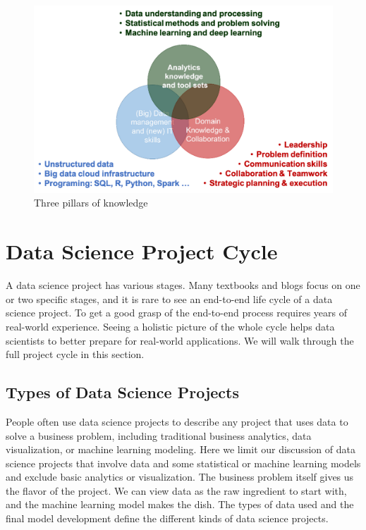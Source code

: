 \documentclass[
  12pt,
]{krantz}
\begin{document}
\begin{figure}

{\centering \includegraphics[width=0.8\linewidth]{images/softskill2} 

}

\caption{Three pillars of knowledge}\label{fig:threepillars}
\end{figure}

\hypertarget{data-science-project-cycle}{%
\section{Data Science Project Cycle}\label{data-science-project-cycle}}

A data science project has various stages. Many textbooks and blogs focus on one or two specific stages, and it is rare to see an end-to-end life cycle of a data science project. To get a good grasp of the end-to-end process requires years of real-world experience. Seeing a holistic picture of the whole cycle helps data scientists to better prepare for real-world applications. We will walk through the full project cycle in this section.

\hypertarget{types-of-data-science-projects}{%
\subsection{Types of Data Science Projects}\label{types-of-data-science-projects}}

People often use data science projects to describe any project that uses data to solve a business problem, including traditional business analytics, data visualization, or machine learning modeling. Here we limit our discussion of data science projects that involve data and some statistical or machine learning models and exclude basic analytics or visualization. The business problem itself gives us the flavor of the project. We can view data as the raw ingredient to start with, and the machine learning model makes the dish. The types of data used and the final model development define the different kinds of data science projects.
\end{document}
